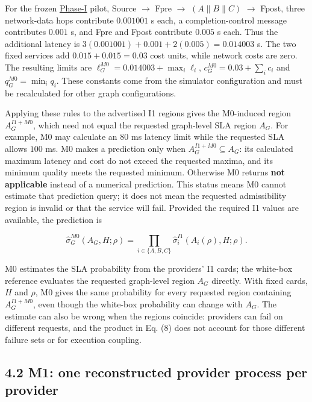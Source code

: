 \documentclass[10pt,a4paper]{article}
\begin{document}
For the frozen \hyperref[app:experiment-stages]{Phase-I} pilot, Source $\to$ Fpre $\to$ $(A\parallel B\parallel C)$ $\to$ Fpost, three network-data hops contribute $0.001001$ s each, a completion-control message contributes $0.001$ s, and Fpre and Fpost contribute $0.005$ s each. Thus the additional latency is $3(0.001001)+0.001+2(0.005)=0.014003$ s. The two fixed services add $0.015+0.015=0.03$ cost units, while network costs are zero. The resulting limits are $\ell_G^{M0}=0.014003+\max_i\ell_i$, $c_G^{M0}=0.03+\sum_i c_i$ and $q_G^{M0}=\min_i q_i$. These constants come from the simulator configuration and must be recalculated for other graph configurations.

Applying these rules to the advertised I1 regions gives the M0-induced region $A_G^{I1+M0}$, which need not equal the requested graph-level SLA region $A_G$. For example, M0 may calculate an $80$ ms latency limit while the requested SLA allows $100$ ms. M0 makes a prediction only when $A_G^{I1+M0}\subseteq A_G$: its calculated maximum latency and cost do not exceed the requested maxima, and its minimum quality meets the requested minimum. Otherwise M0 returns \textbf{not applicable} instead of a numerical prediction. This status means M0 cannot estimate that prediction query; it does not mean the requested admissibility region is invalid or that the service will fail. Provided the required I1 values are available, the prediction is

\begin{equation*}
\widehat\sigma_G^{M0}(A_G,H;\rho)
=\prod_{i\in\{A,B,C\}}
\widehat\sigma_i^{I1}(A_i(\rho),H;\rho).
\tag{8}
\end{equation*}

M0 estimates the SLA probability from the providers' I1 cards; the white-box reference evaluates the requested graph-level region $A_G$ directly. With fixed cards, $H$ and $\rho$, M0 gives the same probability for every requested region containing $A_G^{I1+M0}$, even though the white-box probability can change with $A_G$. The estimate can also be wrong when the regions coincide: providers can fail on different requests, and the product in Eq. (8) does not account for those different failure sets or for execution coupling.

\subsection*{4.2 M1: one reconstructed provider process per provider}
\label{sec:provider-model-family}
\end{document}
